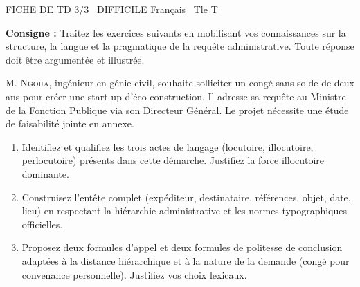 \documentclass[11pt]{article}
\begin{document}
\begin{tcolorbox}[enhanced,colback=popink,colframe=popink,arc=10pt,boxrule=0pt,left=12pt,right=12pt,top=9pt,bottom=9pt]
{\color{white}\popxbold\small FICHE DE TD 3/3 \textbullet\ DIFFICILE \hfill Français \textbullet\ Tle T\par}
\end{tcolorbox}
\vspace{4pt}
\noindent\textbf{Consigne :} Traitez les exercices suivants en mobilisant vos connaissances sur la structure, la langue et la pragmatique de la requête administrative. Toute réponse doit être argumentée et illustrée.

\begin{exercice}
M. \textsc{Ngoua}, ingénieur en génie civil, souhaite solliciter un congé sans solde de deux ans pour créer une start-up d'éco-construction. Il adresse sa requête au Ministre de la Fonction Publique via son Directeur Général. Le projet nécessite une étude de faisabilité jointe en annexe.
\begin{enumerate}
    \item Identifiez et qualifiez les trois actes de langage (locutoire, illocutoire, perlocutoire) présents dans cette démarche. Justifiez la force illocutoire dominante.
    \item Construisez l'entête complet (expéditeur, destinataire, références, objet, date, lieu) en respectant la hiérarchie administrative et les normes typographiques officielles.
    \item Proposez deux formules d'appel et deux formules de politesse de conclusion adaptées à la distance hiérarchique et à la nature de la demande (congé pour convenance personnelle). Justifiez vos choix lexicaux.
\end{enumerate}
\end{exercice}
\end{document}
